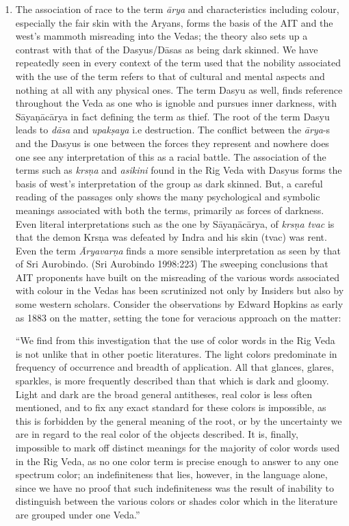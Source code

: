 \begin{enumerate}
 \item The association of race to the term \textit{ārya} and characteristics including colour, especially the fair skin with the Aryans, forms the basis of the AIT and the west’s mammoth misreading into the Vedas; the theory also sets up a contrast with that of the Dasyus/Dāsas as being dark skinned. We have repeatedly seen in every context of the term used that the nobility associated with the use of the term refers to that of cultural and mental aspects and nothing at all with any physical ones. The term Dasyu as well, finds reference throughout the Veda as one who is ignoble and pursues inner darkness, with Sāyaṇācārya in fact defining the term as thief. The root of the term Dasyu leads to \textit{dāsa} and \textit{upakṣaya} i.e destruction. The conflict between the \textit{ārya}-s and the Dasyus is one between the forces they represent and nowhere does one see any interpretation of this as a racial battle. The association of the terms such as \textit{krsṇa }and \textit{asikini} found in the Rig Veda with Dasyus forms the basis of west’s interpretation of the group as dark skinned. But, a careful reading of the passages only shows the many psychological and symbolic meanings associated with both the terms, primarily as forces of darkness. Even literal interpretations such as the one by Sāyaṇācārya, of \textit{krsṇa tvac} is that the demon Krsṇa was defeated by Indra and his skin (tvac) was rent. Even the term \textit{Āryavarṇa} finds a more sensible interpretation as seen by that of Sri Aurobindo. (Sri Aurobindo 1998:223) The sweeping conclusions that AIT proponents have built on the misreading of the various words associated with colour in the Vedas has been scrutinized not only by Insiders but also by some western scholars. Consider the observations by Edward Hopkins as early as 1883 on the matter, setting the tone for veracious approach on the matter:

\begin{myquote}
“We find from this investigation that the use of color words in the Rig Veda is not unlike that in other poetic literatures. The light colors predominate in frequency of occurrence and breadth of application. All that glances, glares, sparkles, is more frequently described than that which is dark and gloomy. Light and dark are the broad general antitheses, real color is less often mentioned, and to fix any exact standard for these colors is impossible, as this is forbidden by the general meaning of the root, or by the uncertainty we are in regard to the real color of the objects described. It is, finally, impossible to mark off distinct meanings for the majority of color words used in the Rig Veda, as no one color term is precise enough to answer to any one spectrum color; an indefiniteness that lies, however, in the language alone, since we have no proof that such indefiniteness was the result of inability to distinguish between the various colors or shades color which in the literature are grouped under one Veda.”


\end{myquote}
\end{enumerate}

